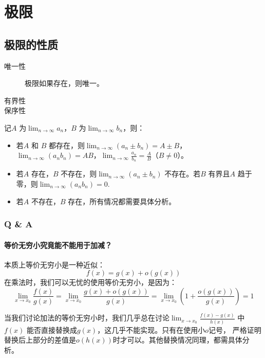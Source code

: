 \chapter{极限}

\section{极限的性质}

\begin{description}
    \item[唯一性] 极限如果存在，则唯一。
    \item[有界性]
    \item[保序性]
\end{description}

记\(A\) 为\(\lim_{n \to \infty} a_{n}\)，\(B\) 为\(\lim_{n \to \infty} b_{n}\)，则：
\begin{itemize}
    \item 若\(A\) 和 \(B\) 都存在，则\(\lim_{n \to \infty} (a_{n} \pm b_{n}) =
        A \pm B\)，
        \(\lim_{n \to \infty} (a_{n} b_{n}) = AB\)，\(\lim_{n \to
        \infty} \frac{a_{n}}{b_{n}} = \frac{A}{B}\)（\(B \neq 0\)）。
    \item 若\(A\) 存在，\(B\) 不存在，则\(\lim_{n \to \infty} (a_{n} \pm
        b_{n})\) 不存在。若\(B\) 有界且\(A\) 趋于零，则\(\lim_{n \to \infty}
        (a_{n} b_{n}) = 0\).
    \item 若\(A\) 不存在，\(B\) 存在，所有情况都需要具体分析。
\end{itemize}

\subsection{Q \& A}
\subsubsection{等价无穷小究竟能不能用于加减？}

本质上等价无穷小是一种近似：
\[
    f(x) = g(x) + o(g(x))
\]
在乘法时，我们可以无忧的使用等价无穷小，是因为：\[
    \lim_{x \to x_{0}} \frac{f(x)}{g(x)} = \lim_{x \to x_{0}}
    \frac{g(x) + o(g(x))}{g(x)} = \lim_{x  \to x_{0}} \left( 1 +
    \frac{o(g(x))}{g(x)} \right) = 1
\]

当我们讨论加法的等价无穷小时，我们几乎总在讨论\(\lim_{x \to x_{0}} \frac{f(x) -
g(x)}{h(x)}\) 中\(f(x)\) 能否直接替换成\(g(x)\)，这几乎不能实现。只有在使用小\(o\)记号，
严格证明替换后上部分的差值是\(o(h(x))\)时才可以。其他替换情况同理，都需具体分析。

